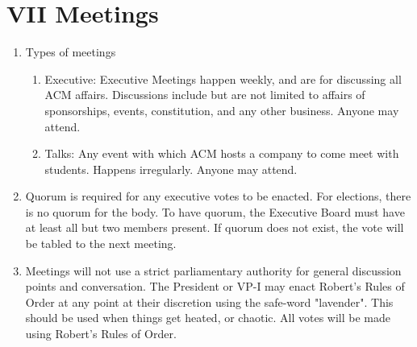 
\section{VII \textendash{} Meetings}
\begin{enumerate}
  \item	Types of meetings
    \begin{enumerate}
      \item Executive: Executive Meetings happen weekly, and are for discussing
      all ACM affairs. Discussions include but are not limited to affairs of
      sponsorships, events, constitution, and any other business. Anyone may attend.
      \item	Talks: Any event with which ACM hosts a company to come meet with
      students. Happens irregularly. Anyone may attend.
    \end{enumerate}
  \item Quorum is required for any executive votes to be enacted. For elections,
  there is no quorum for the body. To have quorum, the Executive Board must have
  at least all but two members present. If quorum does not exist, the vote will
  be tabled to the next meeting.
  \item Meetings will not use a strict parliamentary authority for general
  discussion points and conversation. The President or VP-I may enact Robert's
  Rules of Order at any point at their discretion using the safe-word
  "lavender". This should be used when things get heated, or chaotic. All votes
  will be made using Robert’s Rules of Order.
\end{enumerate}
